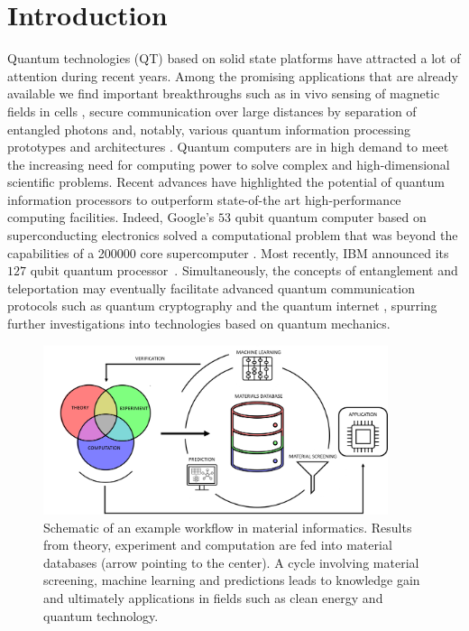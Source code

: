 \documentclass[superscriptaddress,
preprint,
 amsmath,amssymb,
 aps,
]{revtex4-2}
\begin{document}


\maketitle

\section*{Introduction}
Quantum technologies (QT) based on solid state platforms have attracted a lot of attention during recent years. 
Among the promising applications that are already available we find important breakthroughs such as in vivo sensing of magnetic fields in cells \cite{Lesage_2013}, secure communication over large distances by separation of entangled photons \cite{Ursin2007} and, notably, various quantum information processing prototypes and architectures \cite{Arute_2019}.  
Quantum computers are in high demand to meet the increasing need for computing power to solve complex and high-dimensional scientific problems. Recent advances have highlighted the potential of quantum information processors to outperform state-of-the art high-performance computing facilities.
Indeed, Google's $53$ qubit quantum computer based on superconducting electronics solved a computational problem that was beyond the capabilities of a \num{200000} core supercomputer \cite{Arute_2019}.
Most recently, IBM announced its $127$ qubit quantum processor~\cite{IBM2021}. Simultaneously, the concepts of entanglement and teleportation may eventually facilitate advanced quantum communication protocols such as quantum cryptography and the quantum internet \cite{quantum-internet-kimble}, spurring further investigations into technologies based on quantum mechanics.

\begin{figure}[t]
    \centering
    \includegraphics[width=0.9\textwidth]{figure1.png}
    \caption{Schematic of an example workflow in material informatics. Results from theory, experiment and computation are fed into material databases (arrow pointing to the center). A cycle involving material screening, machine learning and predictions leads to knowledge gain and ultimately applications in fields such as clean energy and quantum technology. 
    }
    \label{fig:ht-workflow}
\end{figure}
\end{document}
